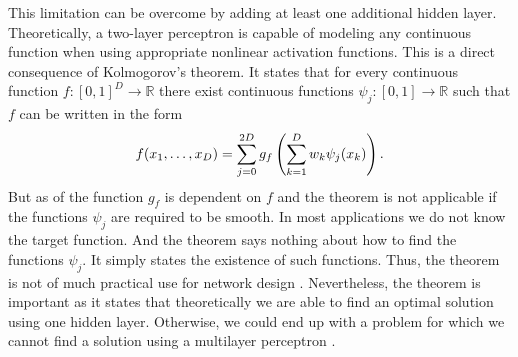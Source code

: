 This limitation can be overcome by adding at least one additional hidden layer. Theoretically, a two-layer perceptron is capable of modeling any continuous function when using appropriate nonlinear activation functions. This is a direct consequence of Kolmogorov's theorem. It states that for every continuous function $f : [0,1]^D \rightarrow \mathbb{R}$ there exist continuous functions $\psi _j : [0,1] \rightarrow \mathbb{R}$ such that $f$ can be written in the form
\begin{align}
f(x_1, \ldots, x_D) = \sum _{j = 0} ^{2D} g_f\left(\sum _{k = 1} ^D w_k \psi _j (x_k)\right)\onedot
\end{align}
But as of \cite[p.~137-140]{Bishop:1995} the function $g_f$ is dependent on $f$ and the theorem is not applicable if the functions $\psi _j$ are required to be smooth. In most applications we do not know the target function. And  the theorem says nothing about how to find the functions $\psi _j$. It simply states the existence of such functions. Thus, the theorem is not of much practical use for network design \cite[p.~287-288]{DudaHartStork:2001}. Nevertheless, the theorem is important as it states that theoretically we are able to find an optimal solution using one hidden layer. Otherwise, we could end up with a problem for which we cannot find a solution using a multilayer perceptron \cite[p.~234-235]{Haykin:2005}.